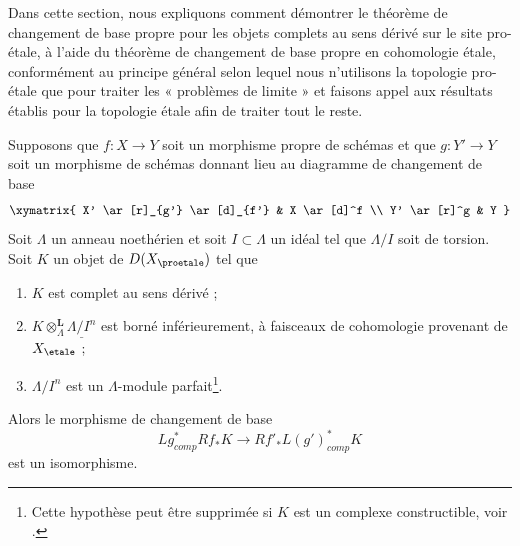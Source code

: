 \noindent
Dans cette section, nous expliquons comment démontrer le théorème de changement de base propre
pour les objets complets au sens dérivé sur le site pro-\'etale, à l'aide du théorème de
changement de base propre en cohomologie \'etale, conformément au principe général
selon lequel nous n'utilisons la topologie pro-\'etale que pour traiter les « problèmes de limite »
et faisons appel aux résultats établis pour la topologie \'etale afin de traiter tout
le reste.

\begin{theorem}
\label{theorem-proper-base-change}
Supposons que $f : X \to Y$ soit un morphisme propre de schémas et que $g : Y' \to Y$ soit
un morphisme de schémas donnant lieu au diagramme de changement de base
$$
\xymatrix{
X' \ar[r]_{g'} \ar[d]_{f'} & X \ar[d]^f \\
Y' \ar[r]^g & Y
}
$$
Soit $\Lambda$ un anneau noethérien et soit $I \subset \Lambda$ un idéal
tel que $\Lambda/I$ soit de torsion. Soit $K$ un objet
de $D(X_\proetale)$ tel que
\begin{enumerate}
\item $K$ est complet au sens dérivé ;
\item $K \otimes_\Lambda^\mathbf{L} \underline{\Lambda/I^n}$ est
borné inférieurement, à faisceaux de cohomologie provenant de $X_\etale$ ;
\item $\Lambda/I^n$ est un $\Lambda$-module parfait\footnote{Cette hypothèse
peut être supprimée si $K$ est un complexe constructible, voir \cite{BS}.}.
\end{enumerate}
Alors le morphisme de changement de base
$$
Lg_{comp}^*Rf_*K \longrightarrow Rf'_*L(g')^*_{comp}K
$$
est un isomorphisme.
\end{theorem}

